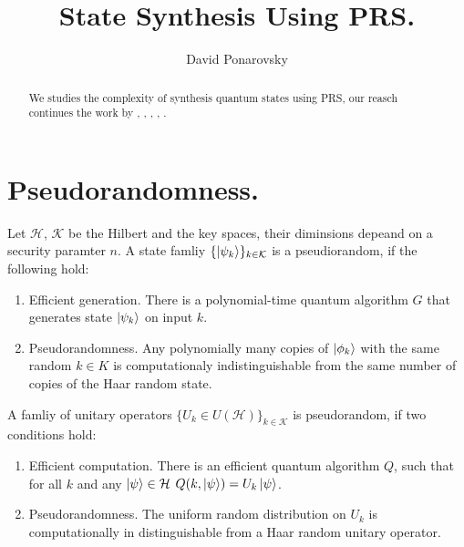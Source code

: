 \documentclass[manuscript,screen,review]{acmart}
\begin{document}

\title{State Synthesis Using PRS.}
\author{David Ponarovsky}
\maketitle

\begin{abstract}
  We studies the complexity of synthesis quantum states using PRS, our reasch
  continues the work by \cite{searchtodecision}, \cite{rosenthal2023efficient},
  \cite{rosenthal2021interactive}, \cite{metger2023stateqip},
  \cite{delavenne2023quantum}.
\end{abstract}

\section{Pseudorandomness.}

\begin{definition} Let $\mathcal{H}$,
  $\mathcal{K}$ be the Hilbert and the key spaces, their diminsions depeand on a
  security paramter $n$. A state famliy $\{\ket{\psi_{k}}\}_{k\in \mathcal{K}}$
  is a pseudiorandom, if the following hold:
  \begin{enumerate}
    \item Efficient generation. There is a polynomial-time quantum algorithm
      $G$ that generates state $\ket{\psi_{k}}$ on input $k$.
    \item Pseudorandomness. Any polynomially many copies of $\ket{\phi_{k}}$
      with the same random $k\in K$ is computationaly indistinguishable from the
      same number of copies of the Haar random state.
  \end{enumerate}
\end{definition}

\begin{definition} A famliy of unitary
  operators $\{ U_{k} \in U(\mathcal{H}) \}_{k \in \mathcal{K}}$ is
  pseudorandom, if two conditions hold:
  \begin{enumerate}
    \item Efficient computation. There is an efficient quantum algorithm $Q$,
      such that for all $k$ and any $\ket{\psi} \in \mathcal{H}$
      $Q(k,\ket{\psi}) =
      U_{k}\ket{\psi}$.
    \item Pseudorandomness. The uniform random distribution on $U_{k}$ is
      computationally in distinguishable from a Haar random unitary operator.
  \end{enumerate}
\end{definition}
\end{document}
